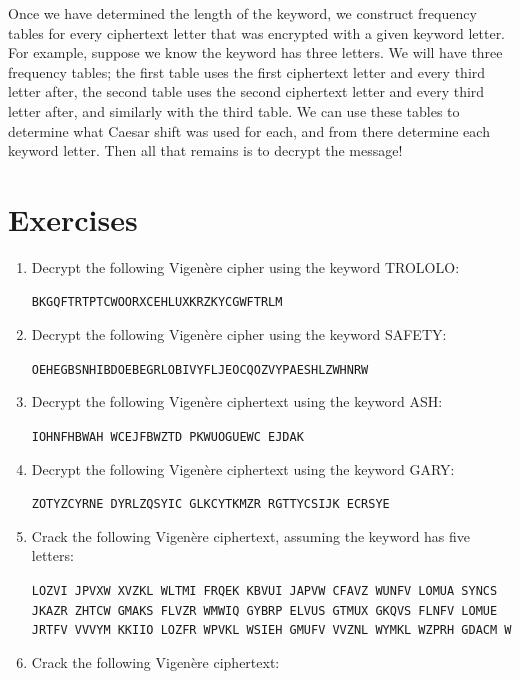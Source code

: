 \documentclass{book}
\theoremstyle{plain}
\theoremstyle{definition}
\newif\ifprintsolutions
\newcommand{\solution}[1]{\ifprintsolutions \begin{sloppypar}{\it #1}\end{sloppypar} \fi} %
\newcommand{\display}[1]{\begin{sloppypar}\setlength{\parindent}{0mm}#1\end{sloppypar}} %
\newcommand{\ciphertextspace}[1]{\begin{sloppypar}\doublespacing\Large\texttt{#1}\end{sloppypar}} %
\begin{document}
Once we have determined the length of the keyword, we construct frequency tables for every ciphertext letter that was encrypted with a given keyword letter. For example, suppose we know the keyword has three letters. We will have three frequency tables; the first table uses the first ciphertext letter and every third letter after, the second table uses the second ciphertext letter and every third letter after, and similarly with the third table. We can use these tables to determine what Caesar shift was used for each, and from there determine each keyword letter. Then all that remains is to decrypt the message!

\section{Exercises}
\begin{enumerate}
\item Decrypt the following Vigen\`{e}re cipher using the keyword TROLOLO:
\display{\ciphertextspace{BKGQFTRTPTCWOORXCEHLUXKRZKYCGWFTRLM}} \solution{It's Friday, Friday, gotta get down on Friday.}
\item Decrypt the following Vigen\`{e}re cipher using the keyword SAFETY: \display{\ciphertextspace{OEHEGBSNHIBDOEBEGRLOBIVYFLJEOCQOZVYPAESHLZWHNRW}} \solution{We can dance if we want to; we can leave your friends behind.}
\item Decrypt the following Vigen\`{e}re ciphertext using the keyword ASH:
\display{\ciphertextspace{IOHNFHBWAH WCEJFBWZTD PKWUOGUEWC EJDAK}} \solution{I wanna be the very best, like no one ever was.}
\item Decrypt the following Vigen\`{e}re ciphertext using the keyword GARY:
\display{\ciphertextspace{ZOTYZCYRNE DYRLZQSYIC GLKCYTKMZR RGTTYCSIJK ECRSYE}} \solution{To catch them all is my real test, to train them is my cause.}
\item Crack the following Vigen\`{e}re ciphertext, assuming the keyword has five letters:
\display{\ciphertextspace{LOZVI JPVXW XVZKL WLTMI FRQEK KBVUI JAPVW CFAVZ WUNFV LOMUA SYNCS JKAZR ZHTCW GMAKS FLVZR WMWIQ GYBRP ELVUS GTMUX GKQVS FLNFV LOMUE JRTFV VVVYM KKIIO LOZFR WPVKL WSIEH GMUFV VVZNL WYMKL WZPRH GDACM W}} \solution{Keyword SHIRE: Three Rings for the Elven-kings under the sky, Seven for the Dwarf-lords in halls of stone, Nine for Mortal Men, doomed to die, One for the Dark Lord on his dark throne, In the Land of Mordor where the Shadows lie.}
\item Crack the following Vigen\`{e}re ciphertext:

\end{enumerate}
\end{document}
